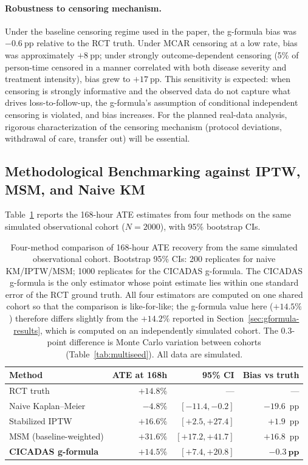 \paragraph{Robustness to censoring mechanism.}
Under the baseline censoring regime used in the paper, the g-formula bias was
\(-0.6~\mathrm{pp}\) relative to the RCT truth. Under MCAR censoring at a low rate, bias
was approximately \(+8~\mathrm{pp}\); under strongly outcome-dependent censoring (5\% of
person-time censored in a manner correlated with both disease severity and treatment
intensity), bias grew to \(+17~\mathrm{pp}\). This sensitivity is expected: when
censoring is strongly informative and the observed data do not capture what drives
loss-to-follow-up, the g-formula's assumption of conditional independent censoring is
violated, and bias increases. For the planned real-data analysis, rigorous
characterization of the censoring mechanism (protocol deviations, withdrawal of care,
transfer out) will be essential.

\subsection{Methodological Benchmarking against IPTW, MSM, and Naive KM}
\label{sec:benchmark}
Table~\ref{tab:benchmark} reports the 168-hour ATE estimates from four methods on the same
simulated observational cohort (\(N = 2000\)), with 95\% bootstrap CIs.

\begin{table}[H]
\centering
\begin{tabular}{lrrr}
\toprule
Method                  & ATE at 168h & 95\% CI         & Bias vs truth \\
\midrule
RCT truth               & $+14.8\%$   & ---             & ---           \\
Naive Kaplan--Meier     & $-4.8\%$    & $[-11.4, -0.2]$ & $-19.6$~pp    \\
Stabilized IPTW         & $+16.6\%$   & $[+2.5, +27.4]$ & $+1.9$~pp     \\
MSM (baseline-weighted) & $+31.6\%$   & $[+17.2, +41.7]$& $+16.8$~pp    \\
\textbf{CICADAS g-formula} & $\mathbf{+14.5\%}$ & $[\mathbf{+7.4, +20.8}]$ & $\mathbf{-0.3~pp}$ \\
\bottomrule
\end{tabular}
\caption{Four-method comparison of 168-hour ATE recovery from the same simulated observational cohort. Bootstrap 95\% CIs: 200 replicates for naive KM/IPTW/MSM; 1000 replicates for the CICADAS g-formula. The CICADAS g-formula is the only estimator whose point estimate lies within one standard error of the RCT ground truth. All four estimators are computed on one shared cohort so that the comparison is like-for-like; the g-formula value here ($+14.5\%$) therefore differs slightly from the $+14.2\%$ reported in Section~\ref{sec:gformula-results}, which is computed on an independently simulated cohort. The 0.3-point difference is Monte Carlo variation between cohorts (Table~\ref{tab:multiseed}). All data are simulated.}
\label{tab:benchmark}
\end{table}

